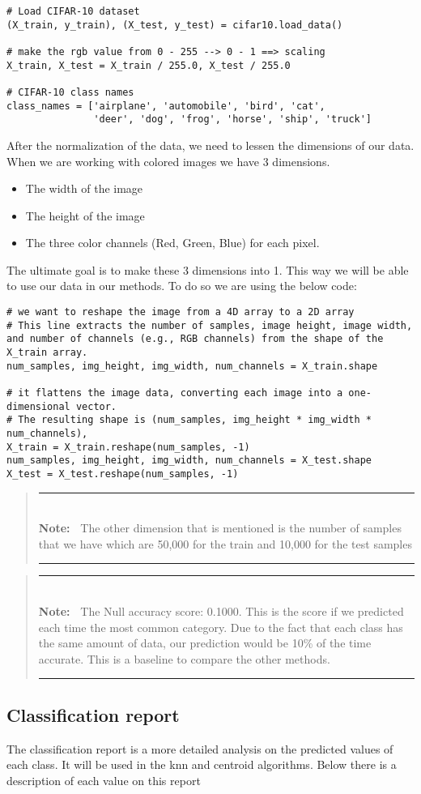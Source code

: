 \documentclass{article}
\newlength{\Lnote}
\newcommand{\notte}[1]
     {\addtolength{\leftmargini}{4em}
        \settowidth{\Lnote}{\textbf{Note:~}}
        \begin{quote}
            \rule{\dimexpr\textwidth-2\leftmargini}{1pt}\\
                        \mbox{}\hspace{-\Lnote}\textbf{Note:~}%
                                            #1\\[-0.5ex] 
            \rule{\dimexpr\textwidth-2\leftmargini}{1pt}
        \end{quote}
        \addtolength{\leftmargini}{-4em}}
\begin{document}
\begin{lstlisting}
# Load CIFAR-10 dataset
(X_train, y_train), (X_test, y_test) = cifar10.load_data()

# make the rgb value from 0 - 255 --> 0 - 1 ==> scaling
X_train, X_test = X_train / 255.0, X_test / 255.0

# CIFAR-10 class names
class_names = ['airplane', 'automobile', 'bird', 'cat',
               'deer', 'dog', 'frog', 'horse', 'ship', 'truck']
\end{lstlisting}

After the normalization of the data, we need to lessen the dimensions of our data. When we are working with colored images we have 3 dimensions.
\begin{itemize}
\item The width of the image 
\item The height of the image 
\item The three color channels (Red, Green, Blue) for each pixel.
\end{itemize}

The ultimate goal is to make these 3 dimensions into 1. This way we will be able to use our data in our methods. To do so we are using the below code: 

\begin{lstlisting}
# we want to reshape the image from a 4D array to a 2D array
# This line extracts the number of samples, image height, image width, and number of channels (e.g., RGB channels) from the shape of the X_train array.
num_samples, img_height, img_width, num_channels = X_train.shape

# it flattens the image data, converting each image into a one-dimensional vector.
# The resulting shape is (num_samples, img_height * img_width * num_channels),
X_train = X_train.reshape(num_samples, -1)
num_samples, img_height, img_width, num_channels = X_test.shape
X_test = X_test.reshape(num_samples, -1)
\end{lstlisting}

\notte{The other dimension that is mentioned is the number of samples that we have which are 50,000 for the train and 10,000 for the test samples}
\notte{The Null accuracy score: 0.1000. This is the score if we predicted each time the most common category. Due to the fact that each class has the same amount of data, our prediction would be 10\% of the time accurate. This is a baseline to compare the other methods.}

\subsection{Classification report}
The classification report is a more detailed analysis on the predicted values of each class. It will be used in the knn and centroid algorithms. Below there is a description of each value on this report 
\end{document}
